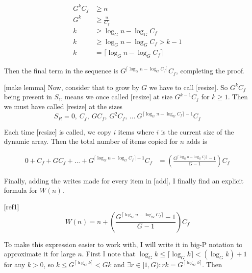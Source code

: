 \documentclass{article}
\newcommand{\nwritesfn}{W}
\newcommand{\varnitems}{n}
\newcommand{\initcapacity}{C_f}
\newcommand{\growthfactor}{G}
\begin{document}
	\begin{align*}
	\growthfactor^k\initcapacity &\geq \varnitems\\
	\growthfactor^k &\geq \frac{\varnitems}{\initcapacity}\\
	k &\geq \log_{\growthfactor} \varnitems - \log_{\growthfactor} \initcapacity\\
	k &\geq \log_{\growthfactor} \varnitems - \log_{\growthfactor} \initcapacity > k - 1\\
	k &= \big\lceil \log_{\growthfactor} \varnitems - \log_{\growthfactor} \initcapacity \big\rceil
	\end{align*}
	
	Then the final term in the sequence is $\growthfactor^{\lceil \log_{\growthfactor} \varnitems - \log_{\growthfactor} \initcapacity \rceil}\initcapacity$, completing the proof.
	
	[make lemma]
	Now, consider that to grow by $\growthfactor$ we have to call [resize]. So $\growthfactor^k\initcapacity$ being present in $S_C$ means we once called [resize] at size $\growthfactor^{k - 1}\initcapacity$ for $k \geq 1$. Then we must have called [resize] at the sizes $$S_R = 0,\ \initcapacity,\ \growthfactor\initcapacity,\ \growthfactor^2\initcapacity,\ \ldots\ \growthfactor^{\lceil \log_{\growthfactor} \varnitems - \log_{\growthfactor} \initcapacity \rceil - 1}\initcapacity$$
	
	Each time [resize] is called, we copy $i$ items where $i$ is the current size of the dynamic array. Then the total number of items copied for $\varnitems$ adds is
	
	\begin{align*}
	0 + \initcapacity + \growthfactor\initcapacity + \ldots + \growthfactor^{\lceil \log_{\growthfactor} \varnitems - \log_{\growthfactor} \initcapacity \rceil - 1}\initcapacity &= \left( \frac{\growthfactor^{\lceil \log_{\growthfactor} \varnitems - \log_{\growthfactor} \initcapacity \rceil} - 1}{\growthfactor - 1} \right) \initcapacity
	\end{align*}
	
	Finally, adding the writes made for every item in [add], I finally find an explicit formula for $\nwritesfn(\varnitems)$.
	
	[ref1]
	$$
	\nwritesfn(\varnitems) = \varnitems + \left( \frac{\growthfactor^{\lceil \log_{\growthfactor} \varnitems - \log_{\growthfactor} \initcapacity \rceil} - 1}{\growthfactor - 1} \right) \initcapacity
	$$
	
	To make this expression easier to work with, I will write it in big-P notation to approximate it for large $\varnitems$. First I note that $\log_{\growthfactor} k \leq \lceil \log_{\growthfactor} k \rceil < \left( \log_{\growthfactor} k \right) + 1$ for any $k > 0$, so $k \leq \growthfactor^{\lceil \log_{\growthfactor} k \rceil} < \growthfactor{k}$ and $\exists r \in {[1, \growthfactor)} : rk = \growthfactor^{\lceil \log_{\growthfactor} k \rceil}$. Then
	
\end{document}
